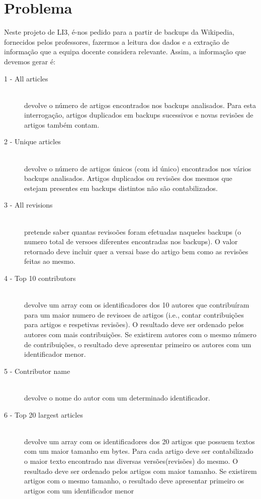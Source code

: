 \documentclass[a4paper]{article}
\begin{document}
\section{Problema}
\label{sec:problema}
Neste projeto de LI3, é-nos pedido para a partir de backups da Wikipedia, fornecidos pelos professores, fazermos a leitura dos dados e a extração de informação que a equipa docente considera relevante. Assim, a informação que devemos gerar é:	
\begin{description}
\item[1 - All articles]\hfill \\ 
devolve o número de artigos encontrados nos backups analisados. Para esta interrogação, artigos duplicados em backups sucessivos e novas revisões de artigos também contam.
\item[2 - Unique articles]\hfill \\ 
devolve o número de artigos únicos (com id único) encontrados nos vários backups analisados. Artigos duplicados ou revisões dos mesmos que estejam presentes em backups distintos não são contabilizados.
\item[3 - All revisions]\hfill \\
pretende saber quantas revisoões foram efetuadas naqueles backups (o numero total de versoes diferentes encontradas nos backups). O valor retornado deve incluir quer a versai base do artigo bem como as revisões feitas ao mesmo.
\item[4 - Top 10 contributors]\hfill \\
devolve um array com os identificadores dos 10 autores que contribuíram para um maior numero de revisoes de artigos (i.e., contar contribuições para artigos e respetivas revisões). O resultado deve ser ordenado pelos autores com mais contribuições. Se existirem autores com o mesmo número de contribuições, o resultado deve apresentar primeiro os autores com um identificador menor.
\item[5 - Contributor name]\hfill \\
devolve o nome do autor com um determinado identificador.
\item[6 - Top 20 largest articles]\hfill \\
devolve um array com os identificadores dos 20 artigos que possuem textos               com um maior tamanho em bytes. Para cada artigo deve ser contabilizado o maior texto               encontrado nas diversas versões(revisões) do mesmo. O resultado deve ser ordenado pelos            artigos com maior tamanho. Se existirem artigos com o mesmo tamanho, o resultado deve              apresentar primeiro os artigos com um identificador menor

\end{description}
\end{document}
